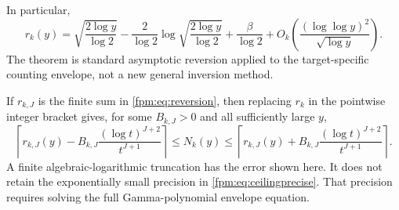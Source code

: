 \documentclass[11pt]{article}
\theoremstyle{definition}\newtheorem{definition}[theorem]{Definition}
\theoremstyle{remark}\newtheorem{remark}[theorem]{Remark}
\begin{document}
In particular,
\[
 r_k(y)=\sqrt{\frac{2\log y}{\log2}}
 -\frac{2}{\log2}\log\sqrt{\frac{2\log y}{\log2}}
 +\frac{\beta}{\log2}
 +O_k\!\left(\frac{(\log\log y)^2}{\sqrt{\log y}}\right).
\]
The theorem is standard asymptotic reversion applied to the target-specific counting envelope, not a new general inversion method.

If $r_{k,J}$ is the finite sum in \eqref{fpm:eq:reversion}, then replacing $r_k$ in the pointwise integer bracket gives, for some $B_{k,J}>0$ and all sufficiently large $y$,
\begin{equation}\label{fpm:eq:ceilingtruncated}
 \left\lceil r_{k,J}(y)-B_{k,J}\frac{(\log t)^{J+2}}{t^{J+1}}\right\rceil
 \le N_k(y)\le
 \left\lceil r_{k,J}(y)+B_{k,J}\frac{(\log t)^{J+2}}{t^{J+1}}\right\rceil.
\end{equation}
A finite algebraic-logarithmic truncation has the error shown here. It does not retain the exponentially small precision in \eqref{fpm:eq:ceilingprecise}. That precision requires solving the full Gamma-polynomial envelope equation.
\end{document}
